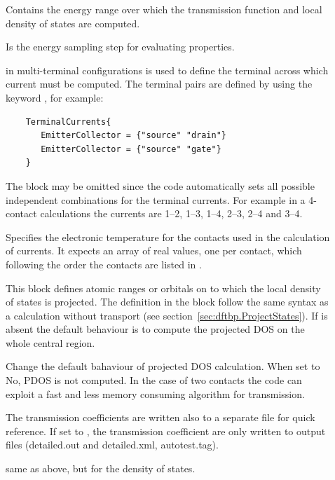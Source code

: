 \begin{description}


\item[] Contains the energy range over
  which the transmission function and local density of states are computed.
\item[] Is the energy sampling step for
  evaluating properties.
\item[] in multi-terminal configurations is used to define
  the terminal across which current must be computed. The terminal pairs are
  defined by using the keyword , for example:
   \begin{verbatim}
    TerminalCurrents{
       EmitterCollector = {"source" "drain"}
       EmitterCollector = {"source" "gate"}
    }
  \end{verbatim}
  The block  may be omitted since the code automatically
  sets all possible independent combinations for the terminal currents. For
  example in a 4-contact calculations the currents are 1--2, 1--3, 1--4, 2--3,
  2--4 and 3--4.
\item[] Specifies the electronic
  temperature for the contacts used in the calculation of currents. It expects
  an array of real values, one per contact, which following the order the
  contacts are listed in .
\item[] \label{Region} This block defines atomic ranges or orbitals
  on to which the local density of states is projected. The definition in the
  block follow the same syntax as a \dftbp{} calculation without transport (see
  section~\ref{sec:dftbp.ProjectStates}). If \label{Region} is absent the default
  behaviour is to compute the projected DOS on the whole central region.
\item[] Change the default bahaviour of projected DOS calculation.
  When set to No, PDOS is not computed. In the case of two contacts
  the code can exploit a fast and less memory consuming algorithm for transmission.
\item[] The transmission coefficients are written also to a
  separate file for quick reference. If set to , the transmission
  coefficient are only written to \dftbp{} output files (detailed.out and
  detailed.xml, autotest.tag).
\item[] same as above, but for the density of states.

\end{description}

